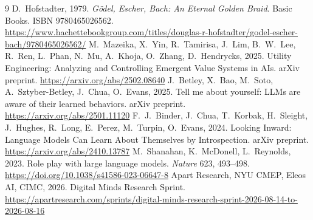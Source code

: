 \documentclass[11pt]{article}
\begin{document}
\begin{thebibliography}{9}\small
{} D.~Hofstadter, 1979. \emph{G\"odel, Escher, Bach: An Eternal
Golden Braid}. Basic Books. ISBN 9780465026562.
\url{https://www.hachettebookgroup.com/titles/douglas-r-hofstadter/godel-escher-bach/9780465026562/}
 M.~Mazeika, X.~Yin, R.~Tamirisa, J.~Lim, B.~W.~Lee, R.~Ren,
L.~Phan, N.~Mu, A.~Khoja, O.~Zhang, D.~Hendrycks, 2025. Utility Engineering:
Analyzing and Controlling Emergent Value Systems in AIs. arXiv preprint.
\url{https://arxiv.org/abs/2502.08640}
 J.~Betley, X.~Bao, M.~Soto, A.~Sztyber-Betley, J.~Chua,
O.~Evans, 2025. Tell me about yourself: LLMs are aware of their learned
behaviors. arXiv preprint. \url{https://arxiv.org/abs/2501.11120}
 F.~J.~Binder, J.~Chua, T.~Korbak, H.~Sleight, J.~Hughes,
R.~Long, E.~Perez, M.~Turpin, O.~Evans, 2024. Looking Inward: Language Models
Can Learn About Themselves by Introspection. arXiv preprint.
\url{https://arxiv.org/abs/2410.13787}
 M.~Shanahan, K.~McDonell, L.~Reynolds, 2023. Role play with
large language models. \emph{Nature} 623, 493--498.
\url{https://doi.org/10.1038/s41586-023-06647-8}
 Apart Research, NYU CMEP, Eleos AI, CIMC, 2026. Digital Minds
Research Sprint.
\url{https://apartresearch.com/sprints/digital-minds-research-sprint-2026-08-14-to-2026-08-16}
\end{thebibliography}

\appendix
\end{document}
